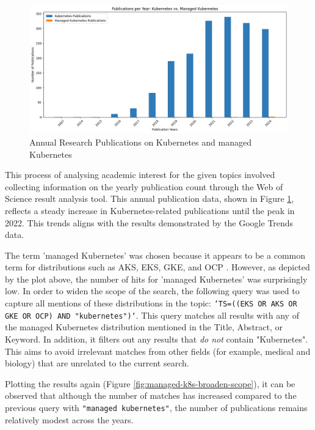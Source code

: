 \FloatBarrier

\begin{figure}
    \centering
    \includegraphics[width=1\linewidth]{resources/55ccf3419c03248ff5a2383d4ae63366.png}
    \caption{Annual Research Publications on Kubernetes and managed Kubernetes}
    \label{fig:research-publications-kubernetes-and-managed-kubernetes}
\end{figure}


This process of analysing academic interest for the given topics involved collecting information on the yearly publication count through the Web of Science result analysis tool. This annual publication data, shown in Figure \ref{fig:research-publications-kubernetes-and-managed-kubernetes}, reflects a steady increase in Kubernetes-related publications until the peak in 2022. This trends aligns with the results demonstrated by the Google Trends data.

The term 'managed Kubernetes' was chosen because it appears to be a common term for distributions such as AKS, EKS, GKE, and OCP \cite{AmazonEKSCustomers,ManagedKubernetesService,pereiraferreiraPerformanceEvaluationContainers2019}. However, as depicted by the plot above, the number of hits for 'managed Kubernetes' was surprisingly low. In order to widen the scope of the search, the following query was used to capture all mentions of these distributions in the topic: \texttt{`TS=((EKS OR AKS OR GKE OR OCP) AND "kubernetes")`}. This query matches all results with any of the managed Kubernetes distribution mentioned in the Title, Abstract, or Keyword. In addition, it filters out any results that \textit{do not} contain "Kubernetes". This aims to avoid irrelevant matches from other fields (for example, medical and biology) that are unrelated to the current search.

Plotting the results again (Figure \ref{fig:managed-k8s-broaden-scope}), it can be observed that although the number of matches has increased compared to the previous query with \texttt{"managed kubernetes"}, the number of publications remains relatively modest across the years.

